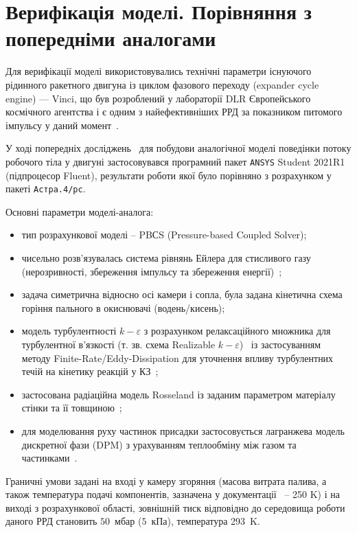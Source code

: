 \section{Верифікація моделі. Порівняння з попередніми аналогами}

Для верифікації моделі використовувались технічні параметри існуючого рідинного ракетного двигуна із циклом фазового переходу (expander cycle engine) --- Vinci, що був розроблений у лабораторії DLR Європейського космічного агентства і є одним з найефективніших РРД за показником питомого імпульсу у даний момент~\cite{VinciData}.

У ході попередніх досліджень~\cite{Previous} для побудови аналогічної моделі поведінки потоку робочого тіла у двигуні застосовувався програмний пакет \texttt{ANSYS} Student 2021R1 (підпроцесор Fluent), результати роботи якої було порівняно з розрахунком у пакеті \texttt{Астра.4/рс}.

Основні параметри моделі-аналога:

\begin{itemize}
	\item тип розрахункової моделі -- PBСS (Pressure-based Coupled Solver);
	\item чисельно розв'язувалась система рівнянь Ейлера для стисливого газу (нерозривності, збереження імпульсу та збереження енергії)~\cite{GuidePBCS};
	\item задача симетрична відносно осі камери і сопла, була задана кінетична схема горіння пального в окиснювачі (водень/кисень);
	\item модель турбулентності $k-\varepsilon$ з розрахунком релаксаційного множника для турбулентної в'язкості (т. зв. схема Realizable $k-\varepsilon$)~\cite{GuideKEpsilon} із застосуванням методу Finite-Rate/Eddy-Dissipation для уточнення впливу турбулентних течій на кінетику реакцій у КЗ~\cite{GuideChemistry};
	\item застосована радіаційна модель Rosseland із заданим параметром матеріалу стінки та її товщиною~\cite{GuideRosseland};
	\item для моделювання руху частинок присадки застосовується лагранжева модель дискретної фази (DPM) з урахуванням теплообміну між газом та частинками~\cite{GuideDPM}.
\end{itemize}

Граничні умови задані на вході у камеру згоряння (масова витрата палива, а також температура подачі компонентів, зазначена у документації~\cite{VinciDataDLR} -- 250 K) і на виході з розрахункової області, зовнішній тиск відповідно до середовища роботи даного РРД становить $50$~мбар ($5$~кПа), температура 293~K.

